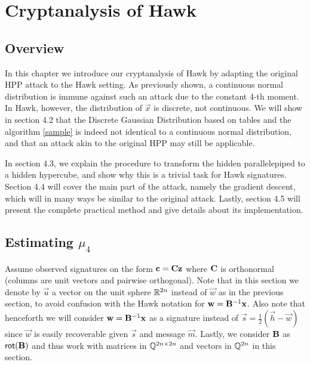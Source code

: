 \chapter{Cryptanalysis of Hawk}

\section{Overview}
In this chapter we introduce our cryptanalysis of Hawk by adapting the original HPP attack to the Hawk setting.
As previously shown, a continuous normal distribution is immune against such an attack due to the constant 4-th moment. In Hawk, however, the distribution of $\vec{x}$ is discrete, not continuous.
We will show in section 4.2 that the Discrete Gaussian Distribution based on tables and the algorithm \ref{sample} is indeed not identical to a continuous normal distribution, and that an attack akin to the original HPP may still be applicable.

In section 4.3, we explain the procedure to transform the hidden parallelepiped to a hidden hypercube, and show why this is a trivial task for Hawk signatures.
Section 4.4 will cover the main part of the attack, namely the gradient descent, which will in many ways be similar to the original attack.
Lastly, section 4.5 will present the complete practical method and give details about its implementation.

\section{Estimating $\mu_4$}
Assume observed signatures on the form $\mathbf{c} = \mathbf{C} \mathbf{z}$ where $\mathbf{C}$ is orthonormal (columns are unit vectors and pairwise orthogonal). 
Note that in this section we denote by $\vec{u}$ a vector on the unit sphere $\mathbb{R}^{2n}$ instead of $\vec{w}$ as in the previous section, to avoid confusion with the Hawk notation for $\mathbf{w} = \mathbf{B}^{-1} \mathbf{x}$.
Also note that henceforth we will consider $\mathbf{w} = \mathbf{B}^{-1} \mathbf{x}$ as a signature instead of $\vec{s} = \frac{1}{2}(\vec{h} - \vec{w})$ since $\vec{w}$ is easily recoverable given $\vec{s}$ and message $\vec{m}$.
Lastly, we consider $\mathbf{B}$ as $\mathsf{rot}(\mathbf{B})$ and thus work with matrices in $\mathbb{Q}^{2n \times 2n}$ and vectors in $\mathbb{Q}^{2n}$ in this section. 

